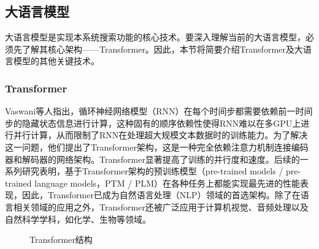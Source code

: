 \documentclass[UTF8,a4paper,12pt]{ctexart}
\numberwithin{equation}{section}
\begin{document}
\subsection{大语言模型}
大语言模型是实现本系统搜索功能的核心技术。要深入理解当前的大语言模型，必须先了解其核心架构——Transformer。因此，本节将简要介绍Transformer及大语言模型的其他关键技术。
\subsubsection{Transformer}
Vaswani等人指出，循环神经网络模型（RNN）在每个时间步都需要依赖前一时间步的隐藏状态信息进行计算，这种固有的顺序依赖性使得RNN难以在多GPU上进行并行计算，从而限制了RNN在处理超大规模文本数据时的训练能力。为了解决这一问题，他们提出了Transformer架构，这是一种完全依赖注意力机制连接编码器和解码器的网络架构。Transformer显著提高了训练的并行度和速度。后续的一系列研究表明，基于Transformer架构的预训练模型（pre-trained models / pre-trained language models，PTM / PLM）在各种任务上都能实现最先进的性能表现，因此，Transformer已成为自然语言处理（NLP）领域的首选架构。除了在语言相关领域的应用之外，Transformer还被广泛应用于计算机视觉、音频处理以及自然科学学科，如化学、生物等领域。\par
\begin{figure}[htb] 
	\caption{Transformer结构}
	\label{transformer}
\end{figure} %
\end{document}

